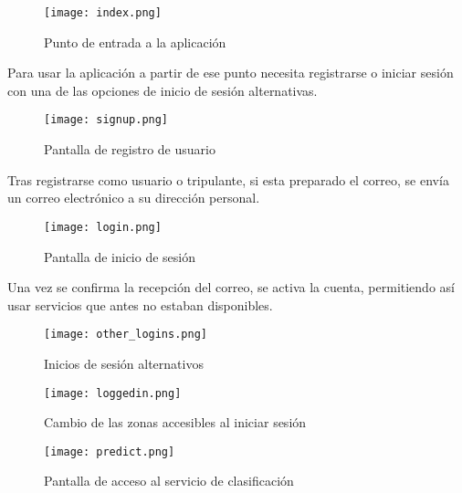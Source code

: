 \begin{figure}
	\centering
	\texttt{[image: index.png]}
	\caption{Punto de entrada a la aplicación}\label{fig:index.png}
\end{figure}

Para usar la aplicación a partir de ese punto necesita registrarse o iniciar sesión con una de las opciones de inicio de sesión alternativas.
\begin{figure}
	\centering
	\texttt{[image: signup.png]}
	\caption{Pantalla de registro de usuario}\label{fig:signup.png}
\end{figure}

Tras registrarse como usuario o tripulante, si esta preparado el correo, se envía un correo electrónico a su dirección personal.
\begin{figure}
	\centering
	\texttt{[image: login.png]}
	\caption{Pantalla de inicio de sesión}\label{fig:login.png}
\end{figure}

Una vez se confirma la recepción del correo, se activa la cuenta, permitiendo así usar servicios que antes no estaban disponibles.

\begin{figure}
	\centering
	\texttt{[image: other\_logins.png]}
	\caption{Inicios de sesión alternativos}\label{fig:other_logins.png}
\end{figure}


\begin{figure}
	\centering
	\texttt{[image: loggedin.png]}
	\caption{Cambio de las zonas accesibles al iniciar sesión}\label{fig:loggedin.png}
\end{figure}


\begin{figure}
	\centering
	\texttt{[image: predict.png]}
	\caption{Pantalla de acceso al servicio de clasificación}\label{fig:predict.png}
\end{figure}







